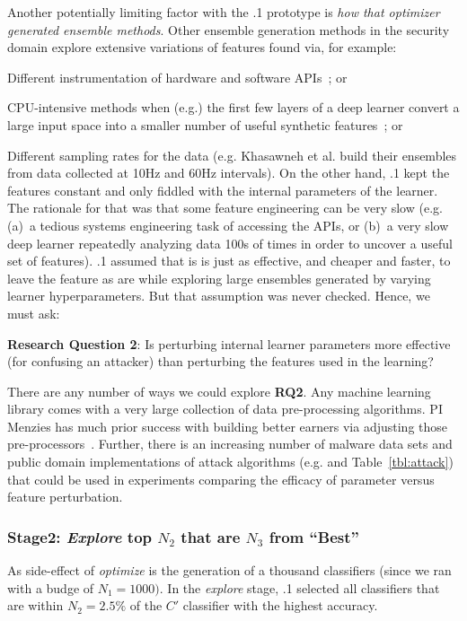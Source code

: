   Another potentially limiting
factor with the {\IT}.1 prototype
is {\em how that optimizer
generated ensemble methods}. Other ensemble generation  methods in the security domain
explore extensive variations  of features found via, for example:
\bi
\item
Different instrumentation of    hardware and software APIs~\cite{khasawneh2017rhmd};
or 
\item
CPU-intensive methods  when (e.g.) the first few layers of a deep learner convert a large input
space into a smaller number of useful synthetic features~\cite{dai19};
or 
\item
Different sampling rates for the data (e.g. Khasawneh et al.
build their ensembles from data collected at 10Hz and 60Hz intervals).
\ei
On the other hand, {\IT}.1 kept the features constant and only fiddled with the
internal parameters of the learner. The rationale for that was
that some feature engineering can be very slow (e.g. (a)~a tedious systems engineering
task of accessing the APIs, or (b)~a very slow   deep learner
  repeatedly analyzing data 100s of times in order to uncover a useful
  set of features).
  {\IT}.1 assumed that is is   just as effective, and  cheaper and faster,
to leave the feature as are while exploring large ensembles generated by varying
learner hyperparameters. But  that assumption was never checked. Hence, we must ask:

\begin{blockquote}
\noindent
\textbf{Research Question 2}: 
Is perturbing internal learner parameters more effective (for confusing an attacker)
than perturbing the features used in the learning?
 \end{blockquote} 
 There are any number of ways we could explore {\bf RQ2}. Any machine learning library comes with a very large collection of data pre-processing algorithms.
  PI Menzies has much prior success with building better earners via adjusting those pre-processors~\cite{agrawal2018better}.
 Further, there is an increasing number of malware data sets and public domain implementations of attack algorithms (e.g.  and Table~\ref{tbl:attack})
 that could be used in experiments comparing the efficacy of parameter versus
 feature perturbation.

 

\subsubsection{Stage2:   {\em Explore} top $N_2$ that are $N_3$ from ``Best''}
As side-effect of {\em optimize} is the generation of a thousand
  classifiers (since we ran with a budge of $N_1=1000)$. In the {\em explore} stage, {\IT}.1 selected all classifiers that are within $N_2=2.5\%$
  of the $C'$ classifier with the highest accuracy.
  

